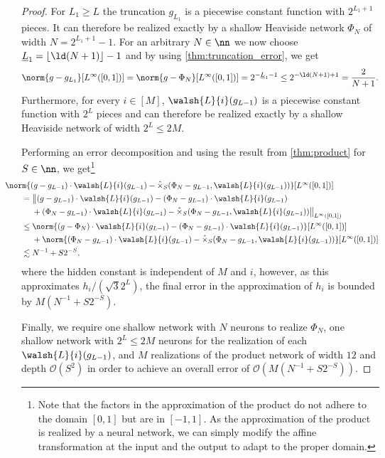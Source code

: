 \documentclass[twoside,11pt]{article}
\begin{document}
\begin{proof}
For $L_1\geq L$ the truncation $g_{L_1}$ is a piecewise constant function with $2^{L_1+1}$ pieces.
It can therefore be realized exactly by a shallow Heaviside network $\Phi_N$ of width $N=2^{L_1+1}-1$.
For an arbitrary $N\in\nn$ we now choose $\underline{L}_1=\lfloor\ld(N+1)\rfloor-1$ and by using \cref{thm:truncation_error}, we get
\begin{align}
    \norm{g-g_{L_1}}[L^{\infty}([0,1])]
    =
    \norm{g-\Phi_N}[L^{\infty}([0,1])]
    =
    2^{-\underline{L}_1-1}
    \leq
    2^{-\ld(N+1)+1}
    =\frac{2}{N+1}.
\end{align}
Furthermore, for every $i\in [M]$, $\walsh{L}{i}(g_{L-1})$ is a piecewise constant function with $2^L$ pieces and can therefore be realized exactly by a shallow Heaviside network of width $2^L\leq 2M$.

Performing an error decomposition and using the result from \cref{thm:product} for $S\in\nn$, we get\footnote{Note that the factors in the approximation of the product do not adhere to the domain $[0,1]$ but are in $[-1,1]$.
    As the approximation of the product is realized by a neural network, we can simply modify the affine transformation at the input and the output to adapt to the proper domain.}
    \begin{align}
        &\kern-2em\norm{(g-g_{L-1}) \cdot \walsh{L}{i}(g_{L-1})
        - \hat{\times}_S(\Phi_N-g_{L-1},  \walsh{L}{i}(g_{L-1}))}[L^\infty([0,1])]  \\
        &= \big\|
            (g-g_{L-1}) \cdot \walsh{L}{i}(g_{L-1}) 
            -
            (\Phi_N-g_{L-1}) \cdot \walsh{L}{i}(g_{L-1})
            \\&\phantom{{}={}}
            + 
            (\Phi_N-g_{L-1}) \cdot \walsh{L}{i}(g_{L-1})
            -
            \hat{\times}_S(\Phi_N-g_{L-1},  \walsh{L}{i}(g_{L-1}))
            \big\|_{L^\infty([0,1])} \\
        &\leq \norm{
            (g-\Phi_N) \cdot \walsh{L}{i}(g_{L-1})
            -
            (\Phi_N-g_{L-1}) \cdot \walsh{L}{i}(g_{L-1})
            }[L^\infty([0,1])] 
        \\&\phantom{{}={}}
        +
        \norm{
            (\Phi_N-g_{L-1}) \cdot \walsh{L}{i}(g_{L-1})
            -
            \hat{\times}_S(\Phi_N-g_{L-1},  \walsh{L}{i}(g_{L-1}))}[L^\infty([0,1])] \\
        &\lesssim N^{-1} + S2^{-S},
    \end{align}
    where the hidden constant is independent of $M$ and $i$, however, as this approximates $h_i/(\sqrt{3}2^L)$, the final error in the approximation of $h_i$ is bounded by $M(N^{-1}+S2^{-S})$.
    
    Finally, we require one shallow network with $N$ neurons to realize $\Phi_N$, one shallow network with $2^L\leq 2M$ neurons for the realization of each $\walsh{L}{i}(g_{L-1})$, and $M$ realizations of the product network of width $12$ and depth $\mathcal{O}(S^2)$
    in order to achieve an overall error of $\mathcal{O}(M(N^{-1}+S2^{-S}))$.
\end{proof}
\end{document}
